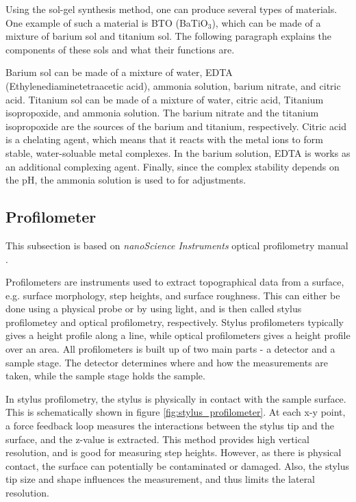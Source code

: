 \noindent Using the sol-gel synthesis method, one can produce several types of materials.
One example of such a material is BTO (BaTiO$_3$), which can be made of a mixture of barium sol and titanium sol.
The following paragraph explains the components of these sols and what their functions are.

Barium sol can be made of a mixture of water, EDTA (Ethylenediaminetetraacetic acid), ammonia solution, barium nitrate, and citric acid.
Titanium sol can be made of a mixture of water, citric acid, Titanium isopropoxide, and ammonia solution.
The barium nitrate and the titanium isopropoxide are the sources of the barium and titanium, respectively.
Citric acid is a chelating agent, which means that it reacts with the metal ions to form stable, water-soluable metal complexes.
In the barium solution, EDTA is works as an additional complexing agent.
Finally, since the complex stability depends on the pH, the ammonia solution is used to for adjustments.

\subsection{Profilometer}

\noindent This subsection is based on \textit{nanoScience Instruments} optical profilometry manual \cite{profilometer_manual}.

Profilometers are instruments used to extract topographical data from a surface, e.g. surface morphology, step heights, and surface roughness.
This can either be done using a physical probe or by using light, and is then called stylus profilometey and optical profilometry, respectively.
Stylus profilometers typically gives a height profile along a line, while optical profilometers gives a height profile over an area.
All profilometers is built up of two main parts - a detector and a sample stage.
The detector determines where and how the measurements are taken, while the sample stage holds the sample.

In stylus profilometry, the stylus is physically in contact with the sample surface.
This is schematically shown in figure \autoref{fig:stylus_profilometer}.
At each x-y point, a force feedback loop measures the interactions between the stylus tip and the surface, and the z-value is extracted.
This method provides high vertical resolution, and is good for measuring step heights.
However, as there is physical contact, the surface can potentially be contaminated or damaged.
Also, the stylus tip size and shape influences the measurement, and thus limits the lateral resolution.

